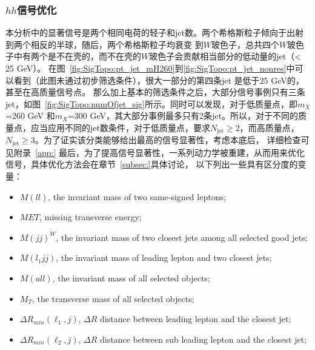 \subsubsection{$hh$信号优化}\label{subsubsec:hh_optimization}
本分析中的显著信号是两个相同电荷的轻子和jet数。两个希格斯粒子倾向于出射到两个相反的半球，随后，两个希格斯粒子均衰变
到$W$玻色子，总共四个$W$玻色子中有两个是不在壳的，而不在壳的$W$玻色子会贡献相当部分的低动量的jet（\pt < 25 GeV）。
在图~\ref{fig:SigTopo:pt_jet_mH260}到\ref{fig:SigTopo:pt_jet_nonres}中可以看到（此图未通过初步筛选条件），很大一部分的第四条jet \pt 是低于25 GeV的，甚至在高质量信号点。
那么加上基本的筛选条件之后，大部分信号事例只有三条jet，如图~\ref{fig:SigTopo:numOfjet_sig}所示。同时可以发现，对于低质量点，即$m_X$=260 GeV 和$m_X$=300 GeV，其大部分事例最多只有2条jet。所以，对于不同的质量点，应当应用不同的jet数条件，对于低质量点，要求$N_\text{jet}\ge$2，而高质量点，$N_\text{jet}\ge$3。为了证实该分类能够给出最高的信号显著性，考虑本底后，
详细检查可见附录~\ref{app:}
最后，为了提高信号显著性，一系列动力学被重建，从而用来优化信号，具体优化方法会在章节~\ref{subsec:}具体讨论，
以下列出一些具有区分度的变量：
\begin{itemize}
 \item $M(ll)$, the invariant mass of two same-signed leptons;
 \item $MET$, missing transverse energy;
 \item $M(jj)^W$, the invariant mass of two closest jets among all selected good jets;
 \item $M(l_1jj)$, the invariant mass of leading lepton and two closest jets;
 \item $M(all)$, the invariant mass of all selected objects;
 \item $M_T$, the transverse mass of all selected objects;
 \item $\Delta R_{min}(\ell_1, j)$, $\Delta R$ distance between leading lepton and the closest jet;
 \item $\Delta R_{min}(\ell_2, j)$, $\Delta R$ distance between sub leading lepton and the closest jet;
\end{itemize}

